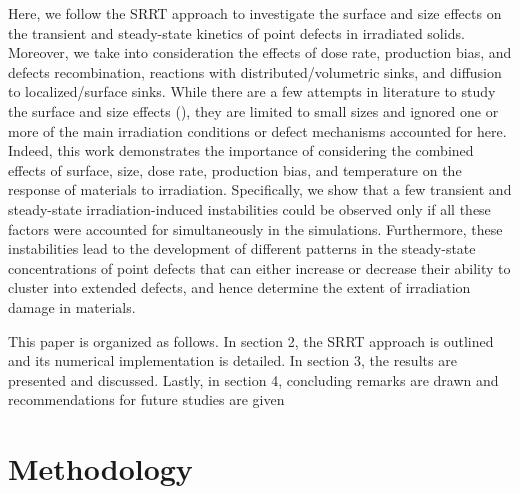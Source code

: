 \documentclass[utf8]{frontiersSCNS} %
\begin{document}
Here, we follow the SRRT approach to investigate the surface and size effects on the transient and steady-state kinetics of point defects in irradiated solids. Moreover, we take into consideration the effects of dose rate, production bias, and defects recombination, reactions with distributed/volumetric sinks, and diffusion to localized/surface sinks. While there are a few attempts in literature to study the surface and size effects (\citep{yang2010,demkowicz2011,xu2012}), they are limited to small sizes and ignored one or more of the main irradiation conditions or defect mechanisms accounted for here. Indeed, this work demonstrates the importance of considering the combined effects of surface, size, dose rate, production bias, and temperature on the response of materials to irradiation. Specifically, we show that a few transient and steady-state irradiation-induced instabilities could be observed only if all these factors were accounted for simultaneously in the simulations. Furthermore, these instabilities lead to the development of different patterns in the steady-state concentrations of point defects that can either increase or decrease their ability to cluster into extended defects, and hence determine the extent of irradiation damage in materials.

This paper is organized as follows. In section 2, the SRRT approach is outlined and its numerical implementation is detailed. In section 3, the results are presented and discussed. Lastly, in section 4, concluding remarks are drawn and recommendations for future studies are given


\newpage
\section{Methodology}

\end{document}
